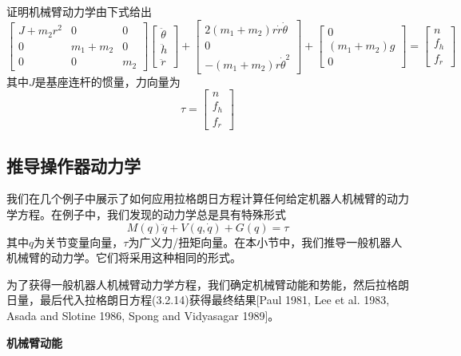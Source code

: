 \documentclass[12pt,a4paper]{ctexart}
\begin{document}
证明机械臂动力学由下式给出
\begin{equation}
\begin{bmatrix} J+m_2r^2 & 0 & 0 \\ 0 & m_1+m_2 & 0 \\ 0 & 0 & m_2 \end{bmatrix} \begin{bmatrix} \ddot{\theta} \\ \ddot{h} \\ \ddot{r} \end{bmatrix} + \begin{bmatrix} 2(m_1+m_2)r\dot{r}\dot{\theta} \\ 0 \\ -(m_1+m_2)r\dot{\theta}^2 \end{bmatrix} + \begin{bmatrix} 0 \\ (m_1+m_2)g \\ 0 \end{bmatrix} = \begin{bmatrix} n \\ f_h \\ f_r \end{bmatrix}
\end{equation}
其中$J$是基座连杆的惯量，力向量为
\begin{equation}
\tau = \begin{bmatrix} n \\ f_h \\
 f_r \end{bmatrix}
\end{equation}

\subsection{推导操作器动力学}

我们在几个例子中展示了如何应用拉格朗日方程计算任何给定机器人机械臂的动力学方程。在例子中，我们发现的动力学总是具有特殊形式
\begin{equation}
M(q)\ddot{q} + V(q,\dot{q}) + G(q) = \tau
\end{equation}
其中$q$为关节变量向量，$\tau$为广义力/扭矩向量。在本小节中，我们推导一般机器人机械臂的动力学。它们将采用这种相同的形式。

为了获得一般机器人机械臂动力学方程，我们确定机械臂动能和势能，然后拉格朗日量，最后代入拉格朗日方程(3.2.14)获得最终结果[Paul 1981, Lee et al. 1983, Asada and Slotine 1986, Spong and Vidyasagar 1989]。

\textbf{机械臂动能}
\end{document}
